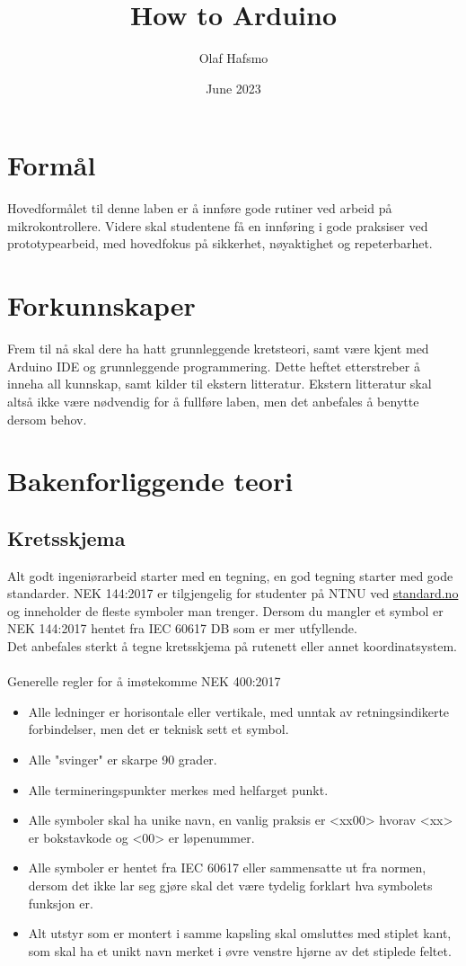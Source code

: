 \documentclass{article}
\title{How to Arduino}
\author{Olaf Hafsmo}
\date{June 2023}
\begin{document}
\maketitle
\newpage
\section*{Formål}
Hovedformålet til denne laben er å innføre gode rutiner ved arbeid på mikrokontrollere.  Videre skal studentene få en innføring i gode praksiser ved prototypearbeid, med hovedfokus på sikkerhet, nøyaktighet og repeterbarhet.

\section*{Forkunnskaper}
Frem til nå skal dere ha hatt grunnleggende kretsteori, samt være kjent med Arduino IDE og grunnleggende programmering. Dette heftet etterstreber å inneha all kunnskap, samt kilder til ekstern litteratur. Ekstern litteratur skal altså ikke være nødvendig for å fullføre laben, men det anbefales å benytte dersom behov.

\section*{Bakenforliggende teori}

\subsection*{Kretsskjema}
Alt godt ingeniørarbeid starter med en tegning, en god tegning starter med gode standarder. NEK 144:2017 er tilgjengelig for studenter på NTNU ved \href{https://handle.standard.no/no/Nettbutikk/produktkatalogen/Produktpresentasjon/?ProductID=923060}{standard.no} og inneholder de fleste symboler man trenger. Dersom du mangler et symbol er NEK 144:2017 hentet fra IEC 60617 DB som er mer utfyllende.
\\
Det anbefales sterkt å tegne kretsskjema på rutenett eller annet koordinatsystem.
\\
\\
Generelle regler for å imøtekomme NEK 400:2017
\begin{itemize}
    \item Alle ledninger er horisontale eller vertikale, med unntak av retningsindikerte forbindelser, men det er teknisk sett et symbol.
    \item Alle "svinger" er skarpe 90 grader.
    \item Alle termineringspunkter merkes med helfarget punkt.
    \item Alle symboler skal ha unike navn, en vanlig praksis er <xx00> hvorav <xx> er bokstavkode og <00> er løpenummer.
    \item Alle symboler er hentet fra IEC 60617 eller sammensatte ut fra normen, dersom det ikke lar seg gjøre skal det være tydelig forklart hva symbolets funksjon er.
    \item Alt utstyr som er montert i samme kapsling skal omsluttes med stiplet kant, som skal ha et unikt navn merket i øvre venstre hjørne av det stiplede feltet.
\end{itemize}
\end{document}
